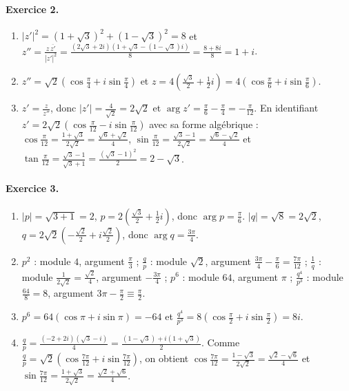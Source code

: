 \begin{corrige}
\paragraph{Exercice 2.}
\begin{enumerate}
\item $|z'|^2 = (1+\sqrt{3})^2 + (1-\sqrt{3})^2 = 8$ et
      $z'' = \frac{z\,\overline{z'}}{|z'|^2} = \frac{(2\sqrt{3}+2i)\left(1+\sqrt{3} - (1-\sqrt{3})i\right)}{8} = \frac{8 + 8i}{8} = \boxed{1 + i}$.
\item $z'' = \sqrt{2}\left(\cos\frac{\pi}{4} + i\sin\frac{\pi}{4}\right)$ et $z = 4\left(\frac{\sqrt{3}}{2} + \frac{1}{2}i\right) = 4\left(\cos\frac{\pi}{6} + i\sin\frac{\pi}{6}\right)$.
\item $z' = \frac{z}{z''}$, donc $|z'| = \frac{4}{\sqrt{2}} = 2\sqrt{2}$ et $\arg z' = \frac{\pi}{6} - \frac{\pi}{4} = -\frac{\pi}{12}$.
      En identifiant $z' = 2\sqrt{2}\left(\cos\frac{\pi}{12} - i\sin\frac{\pi}{12}\right)$ avec sa forme alg\'ebrique :
      $\cos\frac{\pi}{12} = \frac{1+\sqrt{3}}{2\sqrt{2}} = \frac{\sqrt{6}+\sqrt{2}}{4}$,
      $\sin\frac{\pi}{12} = \frac{\sqrt{3}-1}{2\sqrt{2}} = \frac{\sqrt{6}-\sqrt{2}}{4}$ et
      $\tan\frac{\pi}{12} = \frac{\sqrt{3}-1}{\sqrt{3}+1} = \frac{(\sqrt{3}-1)^2}{2} = 2 - \sqrt{3}$.
\end{enumerate}

\paragraph{Exercice 3.}
\begin{enumerate}
\item $|p| = \sqrt{3+1} = 2$, $p = 2\left(\frac{\sqrt{3}}{2} + \frac{1}{2}i\right)$, donc $\arg p = \frac{\pi}{6}$.
      $|q| = \sqrt{8} = 2\sqrt{2}$, $q = 2\sqrt{2}\left(-\frac{\sqrt{2}}{2} + i\frac{\sqrt{2}}{2}\right)$, donc $\arg q = \frac{3\pi}{4}$.
\item $p^2$ : module $4$, argument $\frac{\pi}{3}$ ;
      $\frac{q}{p}$ : module $\sqrt{2}$, argument $\frac{3\pi}{4} - \frac{\pi}{6} = \frac{7\pi}{12}$ ;
      $\frac{1}{q}$ : module $\frac{1}{2\sqrt{2}} = \frac{\sqrt{2}}{4}$, argument $-\frac{3\pi}{4}$ ;
      $p^6$ : module $64$, argument $\pi$ ;
      $\frac{q^4}{p^3}$ : module $\frac{64}{8} = 8$, argument $3\pi - \frac{\pi}{2} \equiv \frac{\pi}{2}$.
\item $p^6 = 64(\cos\pi + i\sin\pi) = \boxed{-64}$ et $\frac{q^4}{p^3} = 8\left(\cos\frac{\pi}{2} + i\sin\frac{\pi}{2}\right) = \boxed{8i}$.
\item $\frac{q}{p} = \frac{(-2+2i)(\sqrt{3}-i)}{4} = \frac{(1-\sqrt{3}) + i(1+\sqrt{3})}{2}$.
      Comme $\frac{q}{p} = \sqrt{2}\left(\cos\frac{7\pi}{12} + i\sin\frac{7\pi}{12}\right)$, on obtient
      $\cos\frac{7\pi}{12} = \frac{1-\sqrt{3}}{2\sqrt{2}} = \frac{\sqrt{2}-\sqrt{6}}{4}$ et
      $\sin\frac{7\pi}{12} = \frac{1+\sqrt{3}}{2\sqrt{2}} = \frac{\sqrt{2}+\sqrt{6}}{4}$.
\end{enumerate}


\end{corrige}
